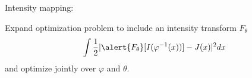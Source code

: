 \documentclass{beamer}
\newcommand\blfootnote[1]{%
  \begingroup
  \renewcommand\thefootnote{}\footnote{#1}%
  \addtocounter{footnote}{-1}%
  \endgroup
}
\begin{document}
\begin{frame}{Intensity mapping: }

Expand optimization problem to include an intensity transform $F_\theta$
\begin{align*}
\int \frac12 |\alert{F_\theta} [I(\varphi^{-1}(x))] - J(x)|^2 dx
\end{align*}
and optimize jointly over $\varphi$  and $\theta$.
%

\end{frame}
\end{document}
